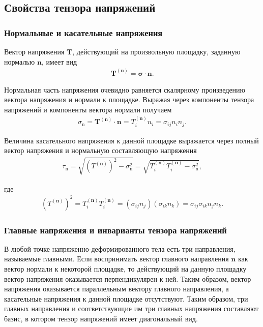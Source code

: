 \clearpage
\newpage

\subsection{Свойства тензора напряжений}

\subsubsection{Нормальные и касательные напряжения}

Вектор напряжения $\mathbf{T}$, действующий на произвольную площадку, заданную нормалью $\mathbf n$, имеет вид
\begin{align}
\mathbf{T}^{(\mathbf n)}= \boldsymbol{\sigma}\cdot\mathbf n.
\end{align}

Нормальная часть напряжения очевидно равняется скалярному произведению вектора напряжения и нормали к площадке. Выражая через компоненты тензора напряжений и компоненты вектора нормали получаем
\begin{align}
\sigma_\mathrm{n} = \mathbf{T}^{(\mathbf{n})}\cdot \mathbf{n} = T^{(\mathbf n)}_i n_i = \sigma_{ij}n_i n_j.
\end{align}

Величина касательного напряжения к данной площадке выражается через полный вектор напряжения и нормальную составляющую напряжения
\begin{align}
\tau_\mathrm{n} = \sqrt{ \left( T^{(\mathbf n)} \right)^2-\sigma_\mathrm{n}^2} = \sqrt{T_i^{(\mathbf n)}T_i^{(\mathbf n)}-\sigma_\mathrm{n}^2},
\end{align}

где
\begin{align}
\left( T^{(\mathbf n)} \right)^2 = T_i^{(\mathbf n)} T_i^{(\mathbf n)} = \left( \sigma_{ij} n_j \right) \left(\sigma_{ik} n_k \right) = \sigma_{ij} \sigma_{ik} n_j n_k.
\end{align}


\subsubsection{Главные напряжения и инварианты тензора напряжений}

В любой точке напряженно-деформированного тела есть три направления, называемые главными. Если воспринимать вектор главного направления $\mathbf{n}$ как вектор нормали к некоторой площадке, то действующий на данную площадку вектор напряжения оказывается перпендикулярен к ней. Таким образом, вектор напряжения оказывается параллельным вектору главного направления, а касательные напряжения к данной площадке отсутствуют. Таким образом, три главных направления и соответствующие им три главных напряжения составляют базис, в котором тензор напряжений имеет диагональный вид.

